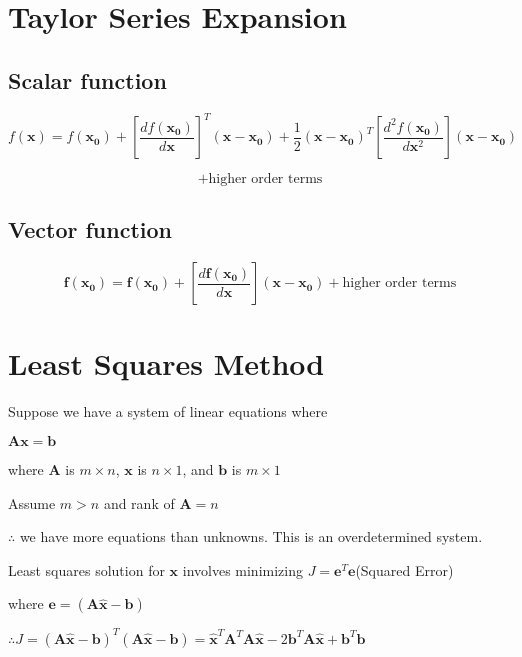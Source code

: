 \documentclass[fleqn]{article}
\begin{document}
	\section{Taylor Series Expansion}
	
	\subsection{Scalar function}
	
	\begin{equation*}
		f(\mathbf{x}) = f(\mathbf{x_0}) + \left[\frac{df(\mathbf{x_0})}{d\mathbf{x}}\right]^T(\mathbf{x} - \mathbf{x_0}) + \frac{1}{2}(\mathbf{x}-\mathbf{x_0})^T\left[\frac{d^2f(\mathbf{x_0})}{d\mathbf{x}^2}\right](\mathbf{x} - \mathbf{x_0}) 
	\end{equation*}
	
	\begin{equation*}
		+ \text{higher order terms}
	\end{equation*}
	
	\subsection{Vector function}
	
	\begin{equation*}
		\mathbf{f}(\mathbf{x_0}) = \mathbf{f}(\mathbf{x_0}) + \left[\frac{d\mathbf{f}(\mathbf{x_0})}{d\mathbf{x}}\right](\mathbf{x} - \mathbf{x_0}) + \text{higher order terms}
	\end{equation*}
	
	\section{Least Squares Method}
	
	Suppose we have a system of linear equations where
	
	$\mathbf{Ax} = \mathbf{b}$
	
	where $\mathbf{A}$ is $m \times n$, $\mathbf{x}$ is $n \times 1$, and $\mathbf{b}$ is $m \times 1$
	
	Assume $m > n$ and rank of $\mathbf{A} = n$
	
	$\therefore$ we have more equations than unknowns. This is an overdetermined system.
	
	Least squares solution for $\mathbf{x}$ involves minimizing $J = \mathbf{e}^T\mathbf{e}$\quad (Squared Error)
	
	where $\mathbf{e} = (\mathbf{A\hat{x}} - \mathbf{b})$
	
	$\therefore J = (\mathbf{A\hat{x}} - \mathbf{b})^T(\mathbf{A\hat{x}} - \mathbf{b}) = \mathbf{\hat{x}}^T\mathbf{A}^T\mathbf{A}\mathbf{\hat{x}} - 2\mathbf{b}^T\mathbf{A\hat{x}} + \mathbf{b}^T\mathbf{b}$
\end{document}
